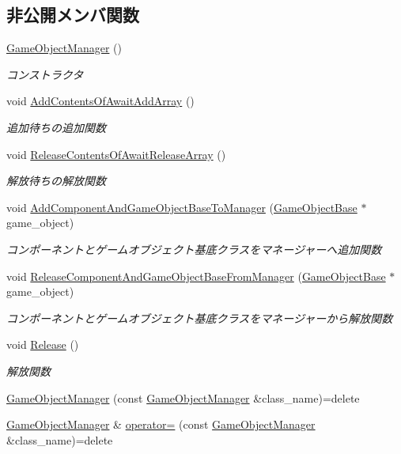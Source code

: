 \subsection*{非公開メンバ関数}
\begin{DoxyCompactItemize}
\item 
\mbox{\hyperlink{class_game_object_manager_a58cbaec4182cda7c6d48eef7b14885e8}{Game\+Object\+Manager}} ()
\begin{DoxyCompactList}\small\item\em コンストラクタ \end{DoxyCompactList}\item 
void \mbox{\hyperlink{class_game_object_manager_a783a9d55d566ab8c39e6ed86b3b52a09}{Add\+Contents\+Of\+Await\+Add\+Array}} ()
\begin{DoxyCompactList}\small\item\em 追加待ちの追加関数 \end{DoxyCompactList}\item 
void \mbox{\hyperlink{class_game_object_manager_a5a6c1208229decd93c6ef396bce35b3a}{Release\+Contents\+Of\+Await\+Release\+Array}} ()
\begin{DoxyCompactList}\small\item\em 解放待ちの解放関数 \end{DoxyCompactList}\item 
void \mbox{\hyperlink{class_game_object_manager_a3263b606ab6bac222bc07c72f0493012}{Add\+Component\+And\+Game\+Object\+Base\+To\+Manager}} (\mbox{\hyperlink{class_game_object_base}{Game\+Object\+Base}} $\ast$game\+\_\+object)
\begin{DoxyCompactList}\small\item\em コンポーネントとゲームオブジェクト基底クラスをマネージャーへ追加関数 \end{DoxyCompactList}\item 
void \mbox{\hyperlink{class_game_object_manager_afaec520481683fb68ce045881def6b2e}{Release\+Component\+And\+Game\+Object\+Base\+From\+Manager}} (\mbox{\hyperlink{class_game_object_base}{Game\+Object\+Base}} $\ast$game\+\_\+object)
\begin{DoxyCompactList}\small\item\em コンポーネントとゲームオブジェクト基底クラスをマネージャーから解放関数 \end{DoxyCompactList}\item 
void \mbox{\hyperlink{class_game_object_manager_ab4f76040ef97f1ad6604ffb89c796d8b}{Release}} ()
\begin{DoxyCompactList}\small\item\em 解放関数 \end{DoxyCompactList}\item 
\mbox{\hyperlink{class_game_object_manager_a51232e494925f5638d6ff83f7581ad93}{Game\+Object\+Manager}} (const \mbox{\hyperlink{class_game_object_manager}{Game\+Object\+Manager}} \&class\+\_\+name)=delete
\item 
\mbox{\hyperlink{class_game_object_manager}{Game\+Object\+Manager}} \& \mbox{\hyperlink{class_game_object_manager_a626e7ffb6c7f3e1ecb6521fcc485234d}{operator=}} (const \mbox{\hyperlink{class_game_object_manager}{Game\+Object\+Manager}} \&class\+\_\+name)=delete
\end{DoxyCompactItemize}
